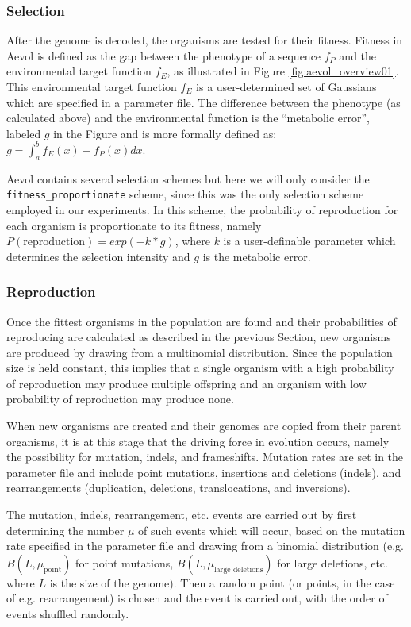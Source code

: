 \subsubsection{Selection}
After the genome is decoded, the organisms are tested for their fitness. Fitness in Aevol is defined as the gap between the phenotype of a sequence $f_P$ and the environmental  target function $f_E$, as illustrated in Figure \ref{fig:aevol_overview01}. This environmental target function $f_E$ is a user-determined set of Gaussians which are specified in a parameter file. The difference between the phenotype (as calculated above) and the environmental function is the ``metabolic error'', labeled $g$ in the Figure and is more formally defined as:  $g = \int_{a}^{b} f_E(x) - f_P(x) dx$.

Aevol contains several selection schemes but here we will only consider the \texttt{fitness\_proportionate} scheme, since this was the only selection scheme employed in our experiments. In this scheme, the probability of reproduction for each organism is proportionate to its fitness, namely $P(\text{reproduction}) = exp(-k * g)$, where $k$ is a user-definable parameter which determines the selection intensity and $g$ is the metabolic error.
\subsubsection{Reproduction}
Once the fittest organisms in the population are found and their probabilities of reproducing are calculated as described in the previous Section, new organisms are produced by drawing from a multinomial distribution. Since the population size is held constant, this implies that a single organism with a high probability of reproduction may produce multiple offspring and an organism with low probability of reproduction may produce none.

When new organisms are created and their genomes are copied from their parent organisms, it is at this stage that the driving force in evolution occurs, namely the possibility for mutation, indels, and frameshifts. Mutation rates are set in the parameter file and include point mutations, insertions and deletions (indels), and rearrangements (duplication, deletions, translocations, and inversions).

The mutation, indels, rearrangement, etc. events are carried out by first determining the number $\mu$ of such events which will occur, based on the mutation rate specified in the parameter file and drawing from a binomial distribution (e.g. $B(L, \mu_\text{point})$ for point mutations, $B(L, \mu_\text{large deletions})$ for large deletions, etc. where $L$ is the size of the genome). Then a random point (or points, in the case of e.g. rearrangement) is chosen and the event is carried out, with the order of events shuffled randomly. 
